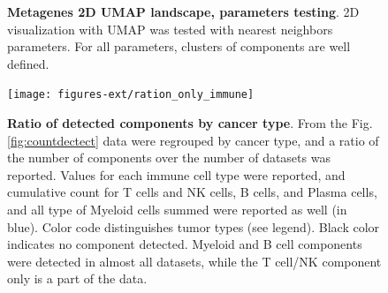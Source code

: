 \documentclass[12pt,]{book}
\theoremstyle{definition}
\theoremstyle{definition}
\theoremstyle{definition}
\theoremstyle{remark}
\begin{document}
\begin{figure}[H]
\caption[Metagenes 2D UMAP landscape, parameters testing]{\textbf{Metagenes 2D UMAP landscape, parameters
testing}. 2D visualization with UMAP was tested with nearest neighbors
parameters. For all parameters, clusters of components are well defined.}\label{fig:umap}
\end{figure}





\begin{figure}

{\centering \texttt{[image: figures-ext/ration\_only\_immune]} 

}

\caption[Ratio of detected components by cancer type]{\textbf{Ratio of detected components by
cancer type}. From the Fig. \ref{fig:countdectect} data were regrouped
by cancer type, and a ratio of the number of components over the number
of datasets was reported. Values for each immune cell type were
reported, and cumulative count for T cells and NK cells, B cells, and
Plasma cells, and all type of Myeloid cells summed were reported as well
(in blue). Color code distinguishes tumor types (see legend). Black
color indicates no component detected. Myeloid and B cell components
were detected in almost all datasets, while the T cell/NK component only
is a part of the data.}\label{fig:ratiodectect}
\end{figure}
\end{document}

